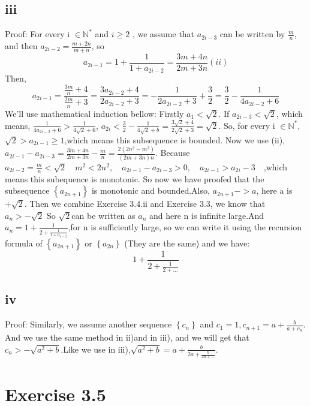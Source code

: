 \documentclass[11pt,twoside,a4paper]{article}
\begin{document}
\subsection{iii}
Proof: For every i  $\in \mathbb{N}^{*}$  and  $i \geqslant 2$ , we assume that $a_{2i-3}$ can be written by $ \frac{m}{n}$,  and then $ a_{2 i-2}=\frac{m+2 n}{m+n}$,  so $$ a_{2 i-1}=1+\frac{1}{1+a_{2 i-2}}=\frac{3 m+4 n}{2 m+3 n} (ii)$$ Then,  $$a_{2 i-1}=\frac{\frac{3 m}{n}+4}{\frac{2 m}{n}+3}=\frac{3 a_{2 i-2}+4}{2 a_{2 i-2}+3}=-\frac{1}{2 a_{2 i-2}+3}+\frac{3}{2}=\frac{3}{2}-\frac{1}{4 a_{2 i-2}+6} $$
We'll use mathematical induction bellow: Firstly $a_{1}<\sqrt{2}$.
If $a_{2i-3}<\sqrt{2}$, which means, $\frac{1}{4 a_{2 i-2}+6}>\frac{1}{4 \sqrt{2}+6}$, $a_{2 i}<\frac{3}{2}-\frac{1}{4 \sqrt{2}+b}=\frac{3 \sqrt{2}+4}{2 \sqrt{2}+3}=\sqrt{2}$. 
So, for every i $\in \mathbb{N}^{*}$,$\sqrt{2}>a_{2i-1}\ge1$,which means this subsequence is bounded.
Now we use (ii),$ a_{2 i-1}-a_{2 i-3}=\frac{3 m+4 n}{2 m+3 n}-\frac{m}{n}=\frac{2\left(2 n^{2}-m^{2}\right)}{(2 m+3 n) n}$. Because $a_{2 i-2}=\frac{m}{n}<\sqrt{2} \quad m^{2}<2 n^{2}, \quad a_{2 i-1}-a_{2 i-3}>0, \quad  a_{2 i-1}>a_{2 i}-3 \quad $,which means this subequence is monotonic. 
So now we have proofed that the subsequence  $\left\{a_{2n+1}\right\}$ is monotonic and bounded.Also, $a_{2n+1}->a$, here a is  $+\sqrt{2}$.
Then we combine Exercise 3.4.ii and Exercise 3.3, we know that $a_{n}>-\sqrt{2}$
So $\sqrt{2}$can be written as $a_{n}$ and here n is infinite large.And $a_{n}=1+\frac{1}{2+\frac{1}{1+a_{n-2}}}$,for n is sufficiently large, so we can write it using the recursion formula of $\left\{a_{2n+1}\right\}$ or $\left\{a_{2n}\right\}$ (They are the same) and we have: $$1+\frac{1}{2+\frac{1}{2+\ldots}}$$
\subsection{iv}
Proof: Similarly, we assume another sequence $\left\{c_{n}\right\}$ and $c_{1}=1, c_{n+1}=a+\frac{b}{a+c_{n}}$. And we use the same method in ii)and in iii), and we will get that $c_{n}>-\sqrt{a^2+b}$.Like we use in iii),$ \sqrt{a^{2}+b}=a+\frac{b}{2 a+\frac{b}{2 a+\ldots}}$.

\section{Exercise 3.5}
\end{document}
